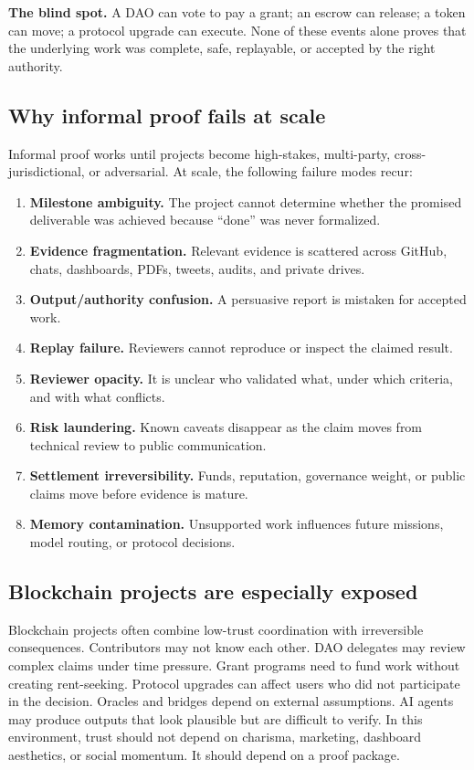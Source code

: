 \documentclass[11pt]{article}
\begin{document}
\begin{dangerbox}
\textbf{The blind spot.} A DAO can vote to pay a grant; an escrow can release; a token can move; a protocol upgrade can execute. None of these events alone proves that the underlying work was complete, safe, replayable, or accepted by the right authority.
\end{dangerbox}

\subsection{Why informal proof fails at scale}

Informal proof works until projects become high-stakes, multi-party, cross-jurisdictional, or adversarial. At scale, the following failure modes recur:

\begin{enumerate}
  \item \textbf{Milestone ambiguity.} The project cannot determine whether the promised deliverable was achieved because ``done'' was never formalized.
  \item \textbf{Evidence fragmentation.} Relevant evidence is scattered across GitHub, chats, dashboards, PDFs, tweets, audits, and private drives.
  \item \textbf{Output/authority confusion.} A persuasive report is mistaken for accepted work.
  \item \textbf{Replay failure.} Reviewers cannot reproduce or inspect the claimed result.
  \item \textbf{Reviewer opacity.} It is unclear who validated what, under which criteria, and with what conflicts.
  \item \textbf{Risk laundering.} Known caveats disappear as the claim moves from technical review to public communication.
  \item \textbf{Settlement irreversibility.} Funds, reputation, governance weight, or public claims move before evidence is mature.
  \item \textbf{Memory contamination.} Unsupported work influences future missions, model routing, or protocol decisions.
\end{enumerate}

\subsection{Blockchain projects are especially exposed}

Blockchain projects often combine low-trust coordination with irreversible consequences. Contributors may not know each other. DAO delegates may review complex claims under time pressure. Grant programs need to fund work without creating rent-seeking. Protocol upgrades can affect users who did not participate in the decision. Oracles and bridges depend on external assumptions. AI agents may produce outputs that look plausible but are difficult to verify. In this environment, trust should not depend on charisma, marketing, dashboard aesthetics, or social momentum. It should depend on a proof package.
\end{document}
